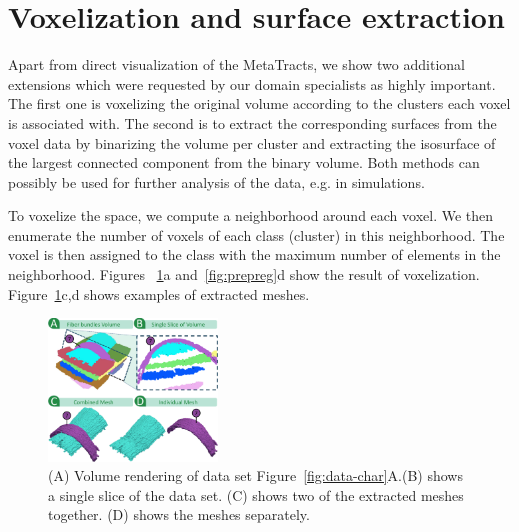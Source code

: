 \section {Voxelization and surface extraction}
\label{sec:vis}

Apart from direct visualization of the MetaTracts, we show two additional extensions which were requested by our domain specialists as highly important. The first one is voxelizing the original volume according to the clusters each voxel is associated with.
The second is to extract the corresponding surfaces from the voxel data by binarizing the volume per cluster and extracting the isosurface of the largest connected component from the binary volume. Both methods can possibly be used for further analysis of the data, e.g. in simulations.

To voxelize the space,  we compute a neighborhood around each voxel. We then enumerate the number of voxels of each class (cluster) in this neighborhood. The voxel is then assigned to the class with the maximum number of elements in the neighborhood. Figures ~\ref{fig:crop-16-decomp}a and~\ref{fig:prepreg}d show the result of voxelization. Figure~\ref{fig:crop-16-decomp}c,d shows examples of extracted meshes.

\begin{figure}
\centering
		\includegraphics[width=0.4\textwidth]{images_pvis/figure7}
	\caption{(A) Volume rendering of data set Figure~\ref{fig:data-char}A.(B) shows a single slice of the data set. (C) shows two of the extracted meshes together. (D) shows the meshes separately.}
	\label{fig:crop-16-decomp}
\end{figure}  



